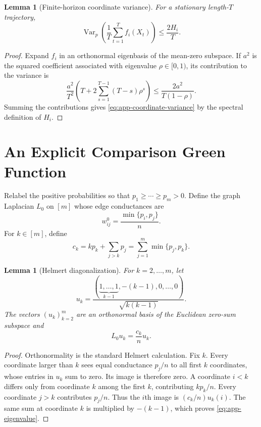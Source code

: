 \documentclass{article}
\newtheorem{lemma}[theorem]{Lemma}
\begin{document}
\begin{lemma}[Finite-horizon coordinate variance]
\label{lem:app-coordinate-variance}
For a stationary length-$T$ trajectory,
\begin{equation}
 \operatorname{Var}_p\!\left(\frac1T\sum_{t=1}^Tf_i(X_t)\right)
 \le\frac{2H_i}{T}.
 \label{eq:app-coordinate-variance}
\end{equation}
\end{lemma}

\begin{proof}
Expand $f_i$ in an orthonormal eigenbasis of the mean-zero subspace. If
$a^2$ is the squared coefficient associated with eigenvalue
$\rho\in[0,1)$, its contribution to the variance is
\[
 \frac{a^2}{T^2}
 \left(T+2\sum_{s=1}^{T-1}(T-s)\rho^s\right)
 \le\frac{2a^2}{T(1-\rho)}.
\]
Summing the contributions gives \eqref{eq:app-coordinate-variance} by the
spectral definition of $H_i$.
\end{proof}

\section{An Explicit Comparison Green Function}
\label{app:profile}

Relabel the positive probabilities so that
$p_1\ge\cdots\ge p_m>0$. Define the graph Laplacian $L_0$ on $[m]$ whose
edge conductances are
\begin{equation}
 w^0_{ij}=\frac{\min\{p_i,p_j\}}{n}.
 \label{eq:app-min-graph}
\end{equation}
For $k\in[m]$, define
\begin{equation}
 c_k=kp_k+\sum_{j>k}p_j
     =\sum_{j=1}^m\min\{p_j,p_k\}.
 \label{eq:app-capped}
\end{equation}

\begin{lemma}[Helmert diagonalization]
\label{lem:app-helmert}
For $k=2,\ldots,m$, let
\begin{equation}
 u_k=\frac{(\underbrace{1,\ldots,1}_{k-1},-(k-1),0,\ldots,0)}
 {\sqrt{k(k-1)}}.
 \label{eq:app-helmert}
\end{equation}
The vectors $(u_k)_{k=2}^m$ are an orthonormal basis of the Euclidean
zero-sum subspace and
\begin{equation}
 L_0u_k=\frac{c_k}{n}u_k.
 \label{eq:app-eigenvalue}
\end{equation}
\end{lemma}

\begin{proof}
Orthonormality is the standard Helmert calculation. Fix $k$. Every coordinate
larger than $k$ sees equal conductance $p_j/n$ to all first $k$ coordinates,
whose entries in $u_k$ sum to zero. Its image is therefore zero. A coordinate
$i<k$ differs only from coordinate $k$ among the first $k$, contributing
$kp_k/n$. Every coordinate $j>k$ contributes $p_j/n$. Thus the $i$th image
is $(c_k/n)u_k(i)$. The same sum at coordinate $k$ is multiplied by
$-(k-1)$, which proves \eqref{eq:app-eigenvalue}.
\end{proof}
\end{document}
